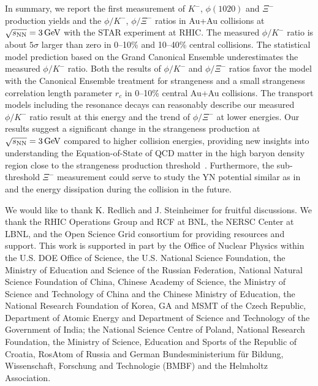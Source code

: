 \documentclass[%
 reprint,	
showpacs,
 amsmath,amssymb,
 aps,
 prc,
]{revtex4-1}
\begin{document}
In summary, we report the first measurement of $K^-$, $\phi(1020)$ and $\Xi^{-}$ production yields  and the $\phi/K^-$, $\phi/\Xi^-$ ratios in Au+Au collisions at ${\sqrt{s_{\rm NN}} = \rm{3\,GeV}}$ with the STAR experiment at RHIC. The measured $\phi/K^-$ ratio is about $5\sigma$ larger than zero in 0--10\% and 10--40\% central collisions. The statistical model prediction based on the Grand Canonical Ensemble underestimates the measured $\phi/K^-$ ratio. Both the results of $\phi/K^-$ and $\phi/\Xi^-$ ratios favor the model with the Canonical Ensemble treatment for strangeness and a small strangeness correlation length parameter $r_c$ in 0--10\% central Au+Au collisions. The transport models including the resonance decays can reasonably describe our measured $\phi/K^-$ ratio result at this energy and the trend of $\phi/\Xi^-$ at lower energies. Our results suggest a significant change in the strangeness production at ${\sqrt{s_{\rm NN}} = \rm{3\,GeV}}$ compared to higher collision energies, providing new insights into understanding the Equation-of-State of QCD matter in the high baryon density region close to the strangeness production threshold~\cite{KO_sQM17,yong2021double}. Furthermore, the sub-threshold $\Xi^-$ measurement could serve to study the YN potential similar as in ~\cite{Ks0_Lambda_HADES} and the energy dissipation during the collision in the future. 




We would like to thank K. Redlich and J. Steinheimer for fruitful discussions.
We thank the RHIC Operations Group and RCF at BNL, the NERSC Center at LBNL, and the Open Science Grid consortium for providing resources and support. This work is supported in part by the Office of Nuclear Physics within the U.S. DOE Office of Science, the U.S. National Science Foundation, the Ministry of Education and Science of the Russian Federation, National Natural Science Foundation of China, Chinese Academy of Science, the Ministry of Science and Technology of China and the Chinese Ministry of Education, the National Research Foundation of Korea, GA and MSMT of the Czech Republic, Department of Atomic Energy and Department of Science and Technology of the Government of India; the National Science Centre of Poland, National Research Foundation, the Ministry of Science, Education and Sports of the Republic of Croatia, RosAtom of Russia and German Bundesministerium f{\"u}r Bildung, Wissenschaft, Forschung and Technologie (BMBF) and the Helmholtz Association.


\end{document}
